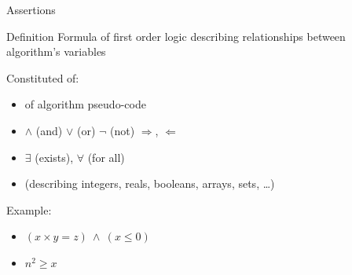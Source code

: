 \begin{frame}{Assertions}

  \begin{block}{Definition}\medskip
    Formula of first order logic describing relationships between algorithm's
    variables
  \end{block}

  \begin{block}{Constituted of:}
    \begin{itemize}
    \item {} of algorithm pseudo-code
    \item {} $\wedge$ (and) $\vee$ (or) $\neg$
      (not) $\Rightarrow$, $\Leftarrow$
    \item {} $\exists$ (exists), $\forall$ (for all)
    \item {} (describing integers, reals,
      booleans, arrays, sets, \ldots)
    \end{itemize}
  \end{block}

  \begin{block}{Example:}
    \begin{itemize}
    \item $(x\times y = z) ~\wedge~ (x\leq 0)$
    \item $n^2\geq x$
    \end{itemize}
  \end{block}
\end{frame}
